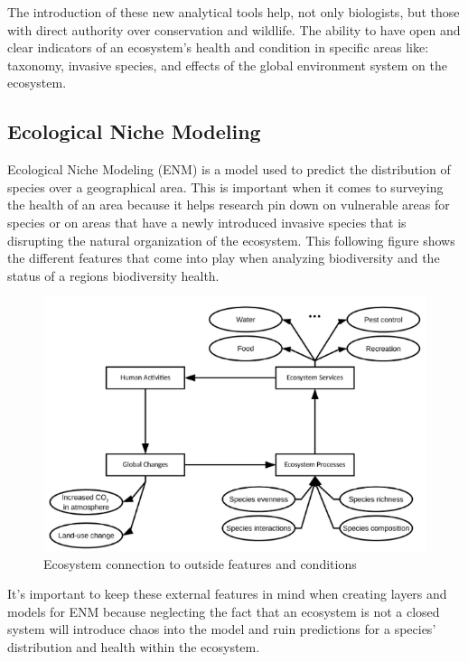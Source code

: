 \documentclass[12pt,journal,compsoc]{IEEEtran}
\begin{document}
The introduction of these new analytical tools help, not only biologists, but those with direct authority over conservation and wildlife. The ability to have open and clear indicators of an ecosystem's health and condition in specific areas like: taxonomy, invasive species, and effects of the global environment system on the ecosystem.
\subsection{Ecological Niche Modeling}
Ecological Niche Modeling (ENM) is a model used to predict the distribution of species over a geographical area. This is important when it comes to surveying the health of an area because it helps research pin down on vulnerable areas for species or on areas that have a newly introduced invasive species that is disrupting the natural organization of the ecosystem. This following figure shows the different features that come into play when analyzing biodiversity and the status of a regions biodiversity health. 
\begin{figure}[H]
    \centering
    \includegraphics[width=\linewidth]{images/Screenshot 2022-06-07 at 23-24-05 A survey of biodiversity informatics Concepts practices and challenges - widm.1394.png}
    \caption{Ecosystem connection to outside features and conditions}
    \label{fig:Ecosystem connection to outside features and conditions}
\end{figure}
It's important to keep these external features in mind when creating layers and models for ENM because neglecting the fact that an ecosystem is not a closed system will introduce chaos into the model and ruin predictions for a species' distribution and health within the ecosystem.  \\ 
\end{document}
